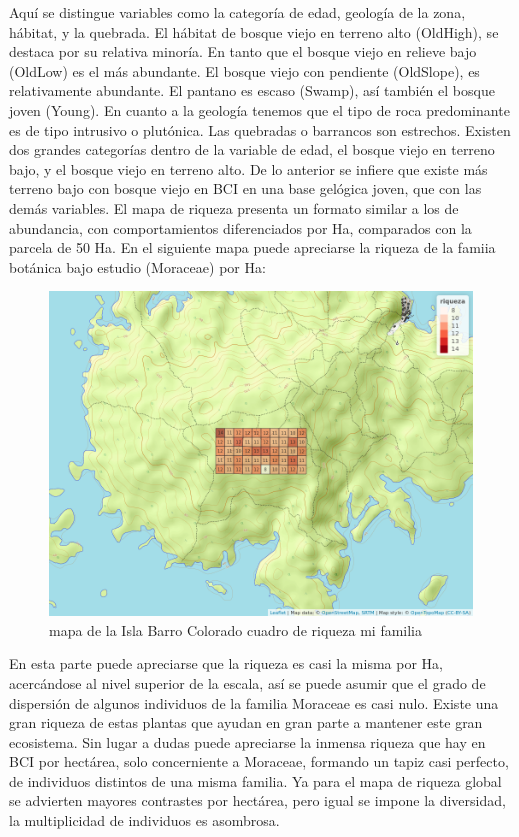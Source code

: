 \documentclass[11pt,]{article}
\begin{document}
Aquí se distingue variables como la categoría de edad, geología de la
zona, hábitat, y la quebrada. El hábitat de bosque viejo en terreno alto
(OldHigh), se destaca por su relativa minoría. En tanto que el bosque
viejo en relieve bajo (OldLow) es el más abundante. El bosque viejo con
pendiente (OldSlope), es relativamente abundante. El pantano es escaso
(Swamp), así también el bosque joven (Young). En cuanto a la geología
tenemos que el tipo de roca predominante es de tipo intrusivo o
plutónica. Las quebradas o barrancos son estrechos. Existen dos grandes
categorías dentro de la variable de edad, el bosque viejo en terreno
bajo, y el bosque viejo en terreno alto. De lo anterior se infiere que
existe más terreno bajo con bosque viejo en BCI en una base gelógica
joven, que con las demás variables. El mapa de riqueza presenta un
formato similar a los de abundancia, con comportamientos diferenciados
por Ha, comparados con la parcela de 50 Ha. En el siguiente mapa puede
apreciarse la riqueza de la famiia botánica bajo estudio (Moraceae) por
Ha:

\begin{figure}
\centering
\includegraphics[width=1.00000\textwidth]{mapa_cuadros_riq_mi_familia.png}
\caption{mapa de la Isla Barro Colorado cuadro de riqueza mi familia
\label{fig:bci_map}}
\end{figure}

En esta parte puede apreciarse que la riqueza es casi la misma por Ha,
acercándose al nivel superior de la escala, así se puede asumir que el
grado de dispersión de algunos individuos de la familia Moraceae es casi
nulo. Existe una gran riqueza de estas plantas que ayudan en gran parte
a mantener este gran ecosistema. Sin lugar a dudas puede apreciarse la
inmensa riqueza que hay en BCI por hectárea, solo concerniente a
Moraceae, formando un tapiz casi perfecto, de individuos distintos de
una misma familia. Ya para el mapa de riqueza global se advierten
mayores contrastes por hectárea, pero igual se impone la diversidad, la
multiplicidad de individuos es asombrosa.
\end{document}
